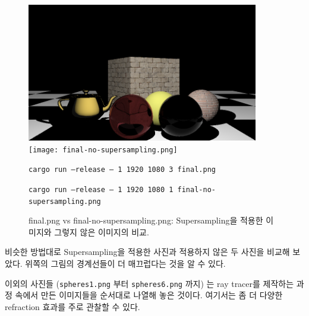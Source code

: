 \documentclass[11pt, a4paper]{article}
\begin{document}
\begin{figure}[H]
  \centering
  \includegraphics[width=0.9\textwidth]{final.png}
  \texttt{[image: final-no-supersampling.png]}
  \caption{final.png vs final-no-supersampling.png: Supersampling을 적용한 이미지와 그렇지 않은 이미지의 비교.}
  \texttt{cargo run --release -- 1 1920 1080 3 final.png}

  \texttt{cargo run --release -- 1 1920 1080 1 final-no-supersampling.png}
\end{figure}

비슷한 방법대로 Supersampling을 적용한 사진과 적용하지 않은 두 사진을 비교해 보았다. 위쪽의 그림의 경계선들이 더 매끄럽다는 것을 알 수 있다.

이외의 사진들 (\texttt{spheres1.png} 부터 \texttt{spheres6.png} 까지) 는 ray tracer를 제작하는 과정 속에서 만든 이미지들을 순서대로 나열해 놓은 것이다. 여기서는 좀 더 다양한 refraction 효과를 주로 관찰할 수 있다.
\end{document}
